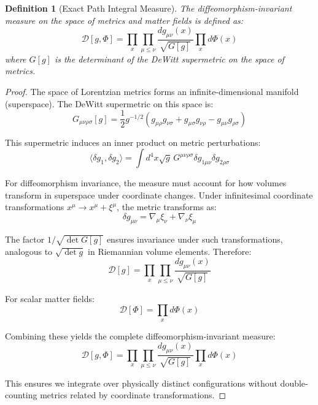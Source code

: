 \documentclass{article}
\newtheorem{definition}{Definition}
\begin{document}
\begin{definition}[Exact Path Integral Measure]
  The diffeomorphism-invariant measure on the space of metrics and matter
  fields is defined as:
  \begin{equation}
    \mathcal{D} [g, \Phi] = \prod_x \prod_{\mu \leq \nu} \frac{dg_{\mu \nu}
    (x)}{\sqrt{G [g]}}  \prod_x d \Phi (x)
  \end{equation}
  where $G [g]$ is the determinant of the DeWitt supermetric on the space of
  metrics.
\end{definition}

\begin{proof}
The space of Lorentzian metrics forms an infinite-dimensional manifold (superspace). The DeWitt supermetric on this space is:
\begin{equation}
G_{\mu\nu\rho\sigma}[g] = \frac{1}{2}g^{-1/2}(g_{\mu\rho}g_{\nu\sigma} + g_{\mu\sigma}g_{\nu\rho} - g_{\mu\nu}g_{\rho\sigma})
\end{equation}

This supermetric induces an inner product on metric perturbations:
\begin{equation}
\langle \delta g_1, \delta g_2 \rangle = \int d^4x \sqrt{g} \, G^{\mu\nu\rho\sigma} \delta g_{1\mu\nu} \delta g_{2\rho\sigma}
\end{equation}

For diffeomorphism invariance, the measure must account for how volumes transform in superspace under coordinate changes. Under infinitesimal coordinate transformations $x^\mu \rightarrow x^\mu + \xi^\mu$, the metric transforms as:
\begin{equation}
\delta g_{\mu\nu} = \nabla_\mu \xi_\nu + \nabla_\nu \xi_\mu
\end{equation}

The factor $1/\sqrt{\det G[g]}$ ensures invariance under such transformations, analogous to $\sqrt{\det g}$ in Riemannian volume elements. Therefore:
\begin{equation}
\mathcal{D}[g] = \prod_x \prod_{\mu \leq \nu} \frac{dg_{\mu\nu}(x)}{\sqrt{G[g]}}
\end{equation}

For scalar matter fields:
\begin{equation}
\mathcal{D}[\Phi] = \prod_x d\Phi(x)
\end{equation}

Combining these yields the complete diffeomorphism-invariant measure:
\begin{equation}
\mathcal{D}[g, \Phi] = \prod_x \prod_{\mu \leq \nu} \frac{dg_{\mu\nu}(x)}{\sqrt{G[g]}} \prod_x d\Phi(x)
\end{equation}

This ensures we integrate over physically distinct configurations without double-counting metrics related by coordinate transformations.
\end{proof}
\end{document}
